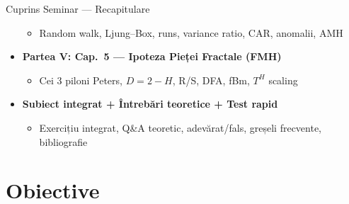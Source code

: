 \documentclass[9pt, aspectratio=169, t]{beamer}
\begin{document}
\begin{frame}[shrink=25]{Cuprins Seminar --- Recapitulare}
\begin{cminipage}{0.95\textwidth}
\begin{itemize}
        \begin{itemize}\setlength{\itemsep}{0pt}
            \item Random walk, Ljung--Box, runs, variance ratio, CAR, anomalii, AMH
        \end{itemize}
        \item \textbf{Partea V: Cap.~5 --- Ipoteza Pieței Fractale (FMH)}
        \begin{itemize}\setlength{\itemsep}{0pt}
            \item Cei 3 piloni Peters, $D=2-H$, R/S, DFA, fBm, $T^H$ scaling
        \end{itemize}
        \item \textbf{Subiect integrat + Întrebări teoretice + Test rapid}
        \begin{itemize}\setlength{\itemsep}{0pt}
            \item Exercițiu integrat, Q\&A teoretic, adevărat/fals, greșeli frecvente, bibliografie
        \end{itemize}
    \end{itemize}
    \end{cminipage}
\end{frame}

\section{Obiective}
\end{document}
